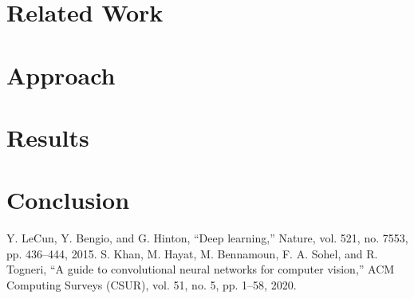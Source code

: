 \documentclass[conference]{IEEEtran}
\begin{document}
\section{Related Work} 


\section{Approach} 


\section{Results} 


\section{Conclusion}


\begin{thebibliography}{00}
 Y. LeCun, Y. Bengio, and G. Hinton, “Deep learning,” Nature, vol. 521, no. 7553, pp. 436–444, 2015.
 S. Khan, M. Hayat, M. Bennamoun, F. A. Sohel, and R. Togneri, “A guide to convolutional neural networks for computer vision,” ACM Computing Surveys (CSUR), vol. 51, no. 5, pp. 1–58, 2020.

\end{thebibliography}
\end{document}
